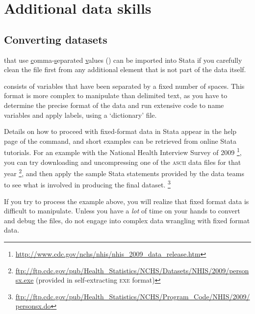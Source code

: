 %
%
\section{Additional data skills}
\label{sec:additional-data-skills}

%
\subsection{Converting datasets}
\label{sec:data-conversion}

\label{sec:insheet}

 that use \underline{c}omma-\underline{s}eparated \underline{v}alues () can be imported into Stata if you carefully clean the file first from any additional element that is not part of the data itself.%

\label{sec:infix}

 consists of variables that have been separated by a fixed number of spaces. This format is more complex to manipulate than delimited text, as you have to determine the precise format of the data and run extensive code to name variables and apply labels, using a `dictionary' file.%

Details on how to proceed with fixed-format data in Stata appear in the help page of the  command, and short examples can be retrieved from online Stata tutorials. For an example with the National Health Interview Survey of 2009%
  \footnote{\url{http://www.cdc.gov/nchs/nhis/nhis_2009_data_release.htm}}, %
  you can try downloading and uncompressing one of the \textsc{ascii} data files for that year%
  \footnote{\eg \url{ftp://ftp.cdc.gov/pub/Health_Statistics/NCHS/Datasets/NHIS/2009/personsx.exe} (provided in self-extracting \textsc{exe} format)}, %
  and then apply the sample Stata statements provided by the data teams to see what is involved in producing the final dataset.%
  \footnote{\eg \url{ftp://ftp.cdc.gov/pub/Health_Statistics/NCHS/Program_Code/NHIS/2009/personsx.do}}%

If you try to process the example above, you will realize that fixed format data is difficult to manipulate. Unless you have a \emph{lot} of time on your hands to convert and debug the files, do not engage into complex data wrangling with fixed format data.%

\label{sec:import-excel}

